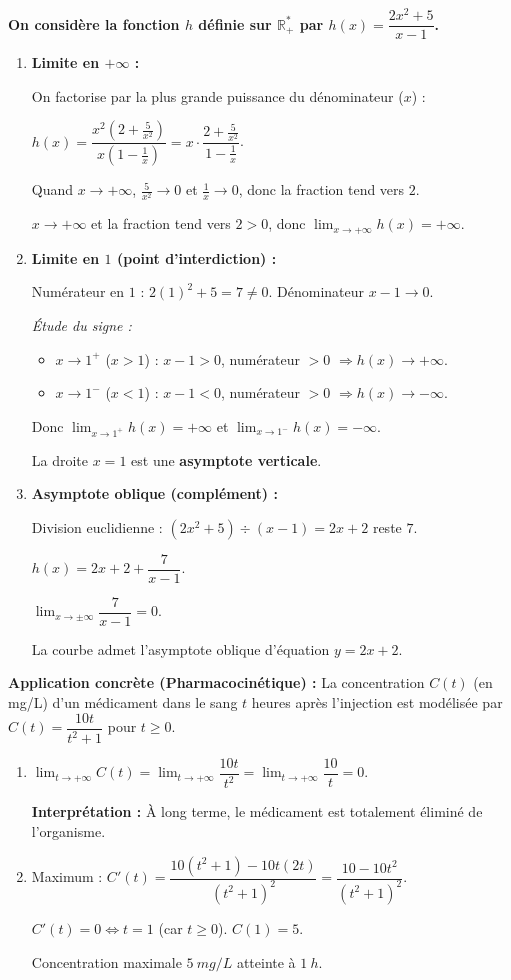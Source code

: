 \documentclass[11pt]{article}
\begin{document}
\begin{corrige}
\textbf{On considère la fonction $h$ définie sur $\mathbb{R}^*_+$ par $h(x) = \dfrac{2x^2 + 5}{x - 1}$.}
\begin{enumerate}
\item \textbf{Limite en $+\infty$ :} \par
On factorise par la plus grande puissance du dénominateur ($x$) : \par
$h(x) = \dfrac{x^2(2 + \frac{5}{x^2})}{x(1 - \frac{1}{x})} = x \cdot \dfrac{2 + \frac{5}{x^2}}{1 - \frac{1}{x}}$. \par
Quand $x \to +\infty$, $\frac{5}{x^2} \to 0$ et $\frac{1}{x} \to 0$, donc la fraction tend vers $2$. \par
$x \to +\infty$ et la fraction tend vers $2 > 0$, donc $\boxed{\lim_{x \to +\infty} h(x) = +\infty}$.
\item \textbf{Limite en $1$ (point d'interdiction) :} \par
Numérateur en $1$ : $2(1)^2 + 5 = 7 \neq 0$. Dénominateur $x-1 \to 0$. \par
\emph{Étude du signe :}
\begin{itemize}
\item $x \to 1^+$ ($x>1$) : $x-1 > 0$, numérateur $>0$ $\Rightarrow h(x) \to +\infty$.
\item $x \to 1^-$ ($x<1$) : $x-1 < 0$, numérateur $>0$ $\Rightarrow h(x) \to -\infty$.
\end{itemize}
Donc $\boxed{\lim_{x \to 1^+} h(x) = +\infty}$ et $\boxed{\lim_{x \to 1^-} h(x) = -\infty}$. \par
La droite $x=1$ est une \textbf{asymptote verticale}.
\item \textbf{Asymptote oblique (complément) :} \par
Division euclidienne : $(2x^2 + 5) \div (x-1) = 2x + 2$ reste $7$. \par
$h(x) = 2x + 2 + \dfrac{7}{x-1}$. \par
$\lim_{x \to \pm\infty} \dfrac{7}{x-1} = 0$. \par
La courbe admet l'asymptote oblique d'équation $\boxed{y = 2x + 2}$.
\end{enumerate}

\textbf{Application concrète (Pharmacocinétique) :} La concentration $C(t)$ (en mg/L) d'un médicament dans le sang $t$ heures après l'injection est modélisée par $C(t) = \dfrac{10t}{t^2+1}$ pour $t \ge 0$.
\begin{enumerate}
\item $\lim_{t \to +\infty} C(t) = \lim_{t \to +\infty} \dfrac{10t}{t^2} = \lim_{t \to +\infty} \dfrac{10}{t} = 0$. \par
\textbf{Interprétation :} À long terme, le médicament est totalement éliminé de l'organisme.
\item Maximum : $C'(t) = \dfrac{10(t^2+1) - 10t(2t)}{(t^2+1)^2} = \dfrac{10 - 10t^2}{(t^2+1)^2}$. \par
$C'(t)=0 \iff t=1$ (car $t\ge 0$). $C(1)=5$. \par
Concentration maximale $\SI{5}{mg/L}$ atteinte à $\SI{1}{h}$.
\end{enumerate}
\end{corrige}
\end{document}
